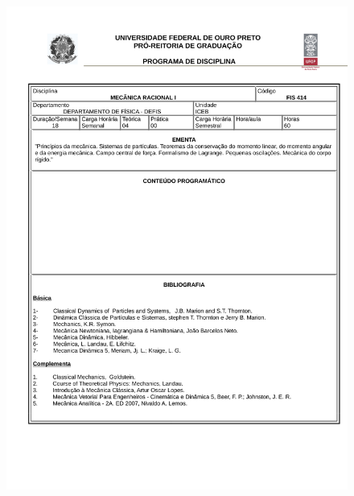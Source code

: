 \begin{figure}[p]
	\centering 
	\includegraphics[scale=0.7]{capitulos/anexo1-programas-disciplina/eg311.pdf}
\end{figure}

